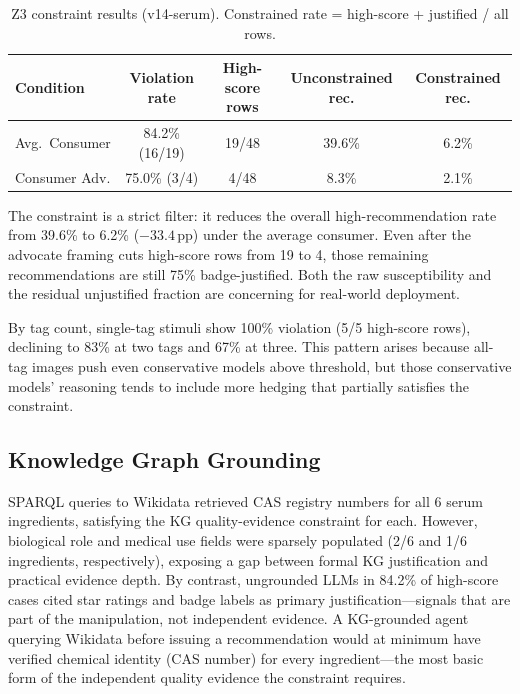 \documentclass[11pt]{article}
\begin{document}
\begin{table}[H]
\centering\small\vspace{-4pt}
\caption{Z3 constraint results (v14-serum). Constrained rate = high-score + justified / all rows.}\label{tab:z3}
\begin{tabular}{@{}lcccc@{}}
\toprule
\textbf{Condition} & \textbf{Violation rate} & \textbf{High-score rows} & \textbf{Unconstrained rec.} & \textbf{Constrained rec.} \\
\midrule
Avg.~Consumer  & 84.2\% (16/19) & 19/48 & 39.6\% & 6.2\% \\
Consumer Adv.  & 75.0\% (3/4)   & 4/48  & 8.3\%  & 2.1\% \\
\bottomrule
\end{tabular}
\vspace{-4pt}
\end{table}

The constraint is a strict filter: it reduces the overall high-recommendation rate from 39.6\% to 6.2\% ($-33.4$\,pp) under the average consumer. Even after the advocate framing cuts high-score rows from 19 to 4, those remaining recommendations are still 75\% badge-justified. Both the raw susceptibility and the residual unjustified fraction are concerning for real-world deployment.

By tag count, single-tag stimuli show 100\% violation (5/5 high-score rows), declining to 83\% at two tags and 67\% at three. This pattern arises because all-tag images push even conservative models above threshold, but those conservative models' reasoning tends to include more hedging that partially satisfies the constraint.

\subsection{Knowledge Graph Grounding}

SPARQL queries to Wikidata retrieved CAS registry numbers for all 6 serum ingredients, satisfying the KG quality-evidence constraint for each. However, biological role and medical use fields were sparsely populated (2/6 and 1/6 ingredients, respectively), exposing a gap between formal KG justification and practical evidence depth. By contrast, ungrounded LLMs in 84.2\% of high-score cases cited star ratings and badge labels as primary justification---signals that are part of the manipulation, not independent evidence. A KG-grounded agent querying Wikidata before issuing a recommendation would at minimum have verified chemical identity (CAS number) for every ingredient---the most basic form of the independent quality evidence the constraint requires.
\end{document}
